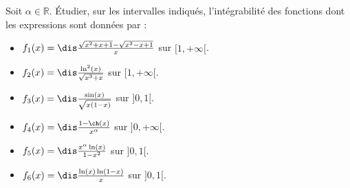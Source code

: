 \documentclass[a4paper,10pt]{report}
\begin{document}
\medskip

\begin{Exercice}{} Soit $\alpha \in \mathbb{R}$. Étudier, sur les intervalles indiqués, l'int\'egrabilit\'e des fonctions dont les expressions sont données par :
\begin{multicols}{2}
\begin{itemize}
\item $f_1(x)=\dis\frac{\sqrt{x^2+x+1}-\sqrt{x^2-x+1}}{x}$ sur \newline $[1,+\infty[$.
\item $f_2(x)=\dis\frac{\ln^2(x)}{\sqrt{x^3+x}}$ sur $[1,+\infty[$.
\item $f_3(x)=\dis\frac{\sin(x)}{\sqrt{x(1-x)}}$ sur $]0,1[$.
\columnbreak
\item $f_4(x)=\dis\frac{1-\ch(x)}{x^{\alpha}}$ sur $]0,+\infty[$.
\item $f_5(x)=\dis\frac{x^{\alpha}\ln(x)}{1-x^2}$ sur $]0,1[$.
\item $f_6(x)=\dis\frac{\ln(x)\ln(1-x)}{x}$ sur $]0,1[$.
\end{itemize}
\end{multicols}

\vspace{0.1cm}
\end{Exercice}

\corr 
\end{document}
